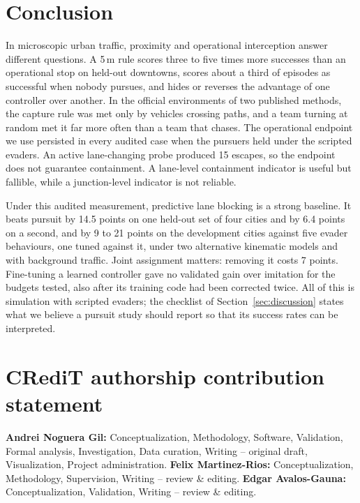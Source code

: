 \documentclass[5p,twocolumn]{elsarticle}
\begin{document}
\section{Conclusion}
\label{sec:conclusion}

In microscopic urban traffic, proximity and operational interception answer different questions. A 5\,m rule scores
three to five times more successes than an operational stop on held-out downtowns, scores about a third of episodes
as successful when nobody pursues, and hides or reverses the advantage of one controller over another. In the
official environments of two published methods, the capture rule was met only by vehicles crossing paths, and a team
turning at random met it far more often than a team that chases. The operational endpoint we use persisted in every
audited case when the pursuers held under the scripted evaders. An active lane-changing probe produced 15 escapes, so
the endpoint does not guarantee containment. A lane-level containment indicator is useful but fallible, while a
junction-level indicator is not reliable.

Under this audited measurement, predictive lane blocking is a strong baseline. It beats pursuit by 14.5 points on one
held-out set of four cities and by 6.4 points on a second, and by 9 to 21 points on the development cities against
five evader behaviours, one tuned against it, under two alternative kinematic models and with background traffic.
Joint assignment matters: removing it costs 7 points. Fine-tuning a learned controller gave no validated gain over
imitation for the budgets tested, also after its training code had been corrected twice. All of this is simulation
with scripted evaders; the checklist of Section~\ref{sec:discussion} states what we believe a pursuit study should
report so that its success rates can be interpreted.

\section*{CRediT authorship contribution statement}
\textbf{Andrei Noguera Gil:} Conceptualization, Methodology, Software, Validation, Formal analysis, Investigation,
Data curation, Writing -- original draft, Visualization, Project administration.
\textbf{Felix Martinez-Rios:} Conceptualization, Methodology, Supervision, Writing -- review \& editing.
\textbf{Edgar Avalos-Gauna:} Conceptualization, Validation, Writing -- review \& editing.
\end{document}
